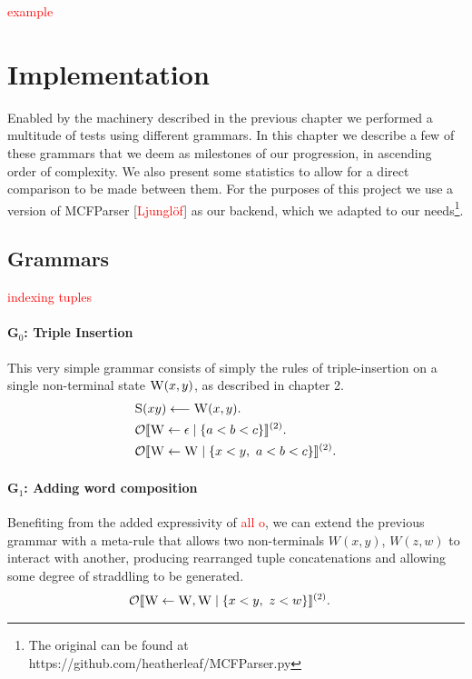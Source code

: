 \documentclass[nonatbib,numbers,10pt]{sigplanconf}
\newcommand\todo[1]{\textcolor{red}{#1}}
\newcommand\s{\textsc}
\newcommand{\Orderr}[5]{
	\mathcal{#1}\llbracket #2 \leftarrow #3 \mid \{ #4 \} \rrbracket^{(#5)}.
}
\newcommand{\Or}[4]{\Orderr{O}{#1}{#2}{#3}{#4}}
\begin{document}
\todo{example}

\section{Implementation}
Enabled by the machinery described in the previous chapter we performed a multitude of tests using different grammars. In this chapter we describe a few of these grammars that we deem as milestones of our progression, in ascending order of complexity. We also present some statistics to allow for a direct comparison to be made between them. For the purposes of this project we use a version of MCFParser [\todo{Ljunglöf}] as our backend, which we adapted to our needs\footnote{The original can be found at https://github.com/heatherleaf/MCFParser.py}.
\subsection{Grammars}
\todo{indexing tuples}
\paragraph{G$_0$: Triple Insertion}
This very simple grammar consists of simply the rules of triple-insertion on a single non-terminal state $\s{W}(x,y)$, as described in chapter 2.
\begin{align*}
&\s{S}(xy) \longleftarrow \s{W}(x,y). \\
&\Or{\s{W}}{\epsilon}{a < b < c}{2} \\
&\Or{\s{W}}{\s{W}}{x < y,\ a < b < c}{2}
\end{align*}

\paragraph{G$_1$: Adding word composition}
Benefiting from the added expressivity of \todo{all o}, we can extend the previous grammar with a meta-rule that allows two non-terminals $W(x,y)$, $W(z,w)$ to interact with another, producing rearranged tuple concatenations and allowing some degree of straddling to be generated.
\begin{align*}
&\Or{\s{W}}{\s{W}, \s{W}}{x < y,\ z < w}{2}
\end{align*}
\end{document}

